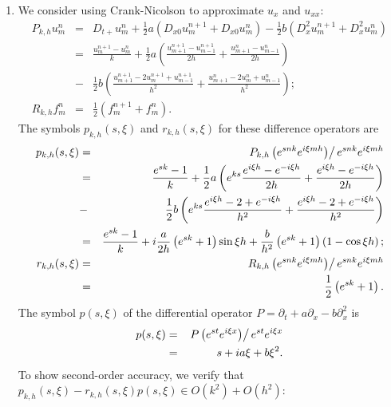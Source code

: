 \documentclass{article}
\begin{document}
\begin{enumerate}
\begin{enumerate}
\item We consider using Crank-Nicolson to approximate \(u_x\) and \(u_{xx}\):
\begin{eqnarray*}
P_{k,h} u^n_m
& = & D_{t+} u^n_m + \frac{1}{2} a \left( D_{x0} u^{n+1}_m + D_{x0} u^n_m \right)
    - \frac{1}{2} b \left( D^2_x u^{n+1}_m + D^2_x u^n_m \right) \\
& = & \frac{u^{n+1}_m - u^n_m}{k}
    + \frac{1}{2} a \left( \frac{u^{n+1}_{m+1} - u^{n+1}_{m-1}}{2h}
                         + \frac{u^n_{m+1} - u^n_{m-1}}{2h} \right) \\
& - & \frac{1}{2} b \left( \frac{u^{n+1}_{m+1} - 2u^{n+1}_m + u^{n+1}_{m-1}}{h^2}
                         + \frac{u^n_{m+1} - 2u^n_m + u^n_{m-1}}{h^2} \right); \\
R_{k,h} f^n_m
& = & \frac{1}{2} \left( f^{n + 1}_m + f^n_m \right).
\end{eqnarray*}
The symbols \(p_{k,h}(s,\xi)\) and \(r_{k,h}(s,\xi)\) for these difference operators are
\begin{eqnarray*}
p_{k,h}(s,\xi)
& = & \left. P_{k,h} \left( e^{snk} e^{i\xi mh} \right) \right/  e^{snk} e^{i\xi mh} \\
& = & \frac{e^{sk} - 1}{k}
    + \frac{1}{2} a \left( e^{ks} \frac{e^{i\xi h} - e^{-i\xi h}}{2h}
                                + \frac{e^{i\xi h} - e^{-i\xi h}}{2h} \right) \\
& - & \frac{1}{2} b \left( e^{ks} \frac{e^{i\xi h} - 2 + e^{-i\xi h}}{h^2}
                                + \frac{e^{i\xi h} - 2 + e^{-i\xi h}}{h^2} \right) \\
& = & \frac{e^{sk} - 1}{k}
    + i\frac{a}{2h} \left( e^{sk} + 1 \right) \sin \xi h
    + \frac{b}{h^2} \left( e^{sk} + 1 \right) \left( 1 - \cos \xi h \right); \\
r_{k,h}(s,\xi)
& = & \left. R_{k,h} \left( e^{snk} e^{i\xi mh} \right) \right/  e^{snk} e^{i\xi mh} \\
& = & \frac{1}{2} \left( e^{sk} + 1 \right).
\end{eqnarray*}
The symbol \(p(s,\xi)\) of the differential operator \(P = \partial_t + a \partial_x - b \partial^2_x\) is
\begin{eqnarray*}
p(s,\xi)
& = & \left. P \left( e^{st} e^{i\xi x} \right) \right/ e^{st} e^{i\xi x} \\
& = & s + ia\xi + b\xi^2.
\end{eqnarray*}
To show second-order accuracy, we verify that \(p_{k,h}(s,\xi) - r_{k,h}(s,\xi) p(s,\xi) \in O(k^2) + O(h^2)\):

\end{enumerate}
\end{enumerate}
\end{document}
